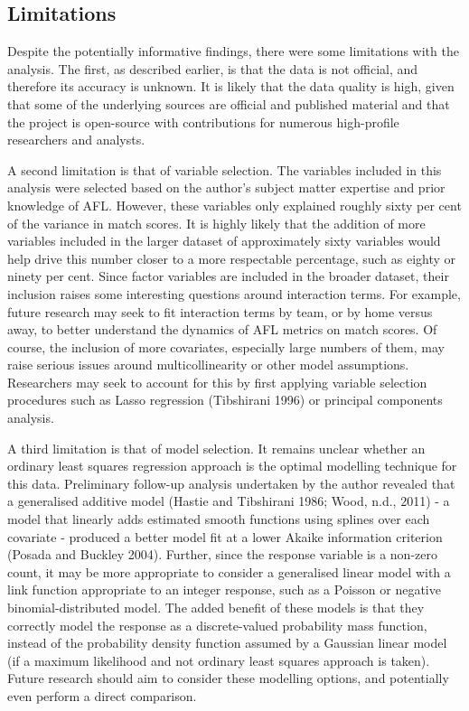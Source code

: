 \documentclass{article}
\begin{document}
\hypertarget{limitations}{%
\subsection{Limitations}\label{limitations}}

Despite the potentially informative findings, there were some limitations with the analysis. The first, as described earlier, is that the data is not official, and therefore its accuracy is unknown. It is likely that the data quality is high, given that some of the underlying sources are official and published material and that the project is open-source with contributions for numerous high-profile researchers and analysts.

A second limitation is that of variable selection. The variables included in this analysis were selected based on the author's subject matter expertise and prior knowledge of AFL. However, these variables only explained roughly sixty per cent of the variance in match scores. It is highly likely that the addition of more variables included in the larger dataset of approximately sixty variables would help drive this number closer to a more respectable percentage, such as eighty or ninety per cent. Since factor variables are included in the broader dataset, their inclusion raises some interesting questions around interaction terms. For example, future research may seek to fit interaction terms by team, or by home versus away, to better understand the dynamics of AFL metrics on match scores. Of course, the inclusion of more covariates, especially large numbers of them, may raise serious issues around multicollinearity or other model assumptions. Researchers may seek to account for this by first applying variable selection procedures such as Lasso regression (Tibshirani 1996) or principal components analysis.

A third limitation is that of model selection. It remains unclear whether an ordinary least squares regression approach is the optimal modelling technique for this data. Preliminary follow-up analysis undertaken by the author revealed that a generalised additive model (Hastie and Tibshirani 1986; Wood, n.d., 2011) - a model that linearly adds estimated smooth functions using splines over each covariate - produced a better model fit at a lower Akaike information criterion (Posada and Buckley 2004). Further, since the response variable is a non-zero count, it may be more appropriate to consider a generalised linear model with a link function appropriate to an integer response, such as a Poisson or negative binomial-distributed model. The added benefit of these models is that they correctly model the response as a discrete-valued probability mass function, instead of the probability density function assumed by a Gaussian linear model (if a maximum likelihood and not ordinary least squares approach is taken). Future research should aim to consider these modelling options, and potentially even perform a direct comparison.
\end{document}
